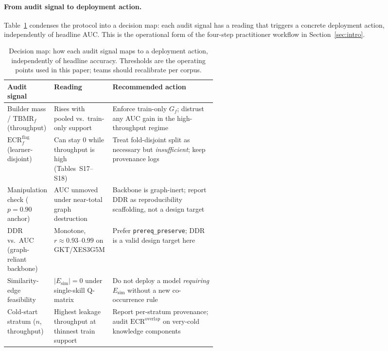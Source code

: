 \documentclass[pdflatex,sn-mathphys-num]{sn-jnl}
\newcommand{\Esim}{\ensuremath{E_{\text{sim}}}}
\newcommand{\KCs}{knowledge components}
\newcommand{\DDR}{\textsc{DDR}}
\begin{document}
\paragraph{From audit signal to deployment action.}
Table~\ref{tab:audit-actions} condenses the protocol into a decision map: each
audit signal has a reading that triggers a concrete deployment action,
independently of headline AUC. This is the operational form of the four-step
practitioner workflow in Section~\ref{sec:intro}.

\begin{table}[t]
\centering
\caption{Decision map: how each audit signal maps to a deployment action,
independently of headline accuracy. Thresholds are the operating points used in
this paper; teams should recalibrate per corpus.}
\label{tab:audit-actions}
\footnotesize
\setlength{\tabcolsep}{4pt}
\begin{tabularx}{\linewidth}{@{} >{\RaggedRight\arraybackslash}p{0.22\linewidth}
  >{\RaggedRight\arraybackslash}p{0.28\linewidth}
  >{\RaggedRight\arraybackslash}X @{}}
\toprule
Audit signal & Reading & Recommended action \\
\midrule
Builder mass / $\mathrm{TBMR}_f$ (throughput) & Rises with pooled vs.\ train-only
support & Enforce train-only $G_f$; distrust any AUC gain in the high-throughput
regime \\
$\mathrm{ECR}^{\mathrm{flag}}_f$ (learner-disjoint) & Can stay $0$ while
throughput is high (Tables~S17--S18) & Treat fold-disjoint split as necessary but
\emph{insufficient}; keep provenance logs \\
Manipulation check ($p{=}0.90$ anchor) & AUC unmoved under near-total graph
destruction & Backbone is graph-inert; report \DDR{} as reproducibility scaffolding,
not a design target \\
\DDR{} vs.\ AUC (graph-reliant backbone) & Monotone, $r{\approx}0.93$--$0.99$ on GKT/XES3G5M
& Prefer \texttt{prereq\_preserve}; \DDR{} is a valid design target here \\
Similarity-edge feasibility & $|E_{\mathrm{sim}}|{=}0$ under single-skill Q-matrix
& Do not deploy a model \emph{requiring} $\Esim$ without a new co-occurrence rule \\
Cold-start stratum ($n$, throughput) & Highest leakage throughput at thinnest
train support & Report per-stratum provenance; audit $\mathrm{ECR}^{\mathrm{overlap}}$
on very-cold \KCs{} \\
\bottomrule
\end{tabularx}
\end{table}
\end{document}
